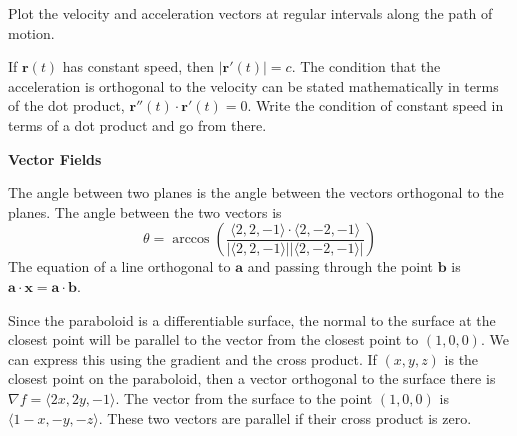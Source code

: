 \begin{Hint}
  \label{hint parametric cos t/2 + sin t/2}
  Plot the velocity and acceleration vectors at regular intervals 
  along the path of motion.
\end{Hint}



\begin{Hint}
  \label{hint constant speed acceleration orthogonal}
  If $\mathbf{r}(t)$ has constant speed, then $| \mathbf{r}'(t) | = c$.
  The condition that the acceleration is orthogonal to the
  velocity can be stated mathematically in terms of the dot product,
  $\mathbf{r}''(t) \cdot \mathbf{r}'(t) = 0$.  Write the condition
  of constant speed in terms of a dot product and go from there.
\end{Hint}



\begin{large}
  \noindent
  \textbf{Vector Fields}
\end{large}



\begin{Hint}
  \label{hint paraboloid x2 + y2 - z}
  The angle between two planes is the angle between the vectors orthogonal to 
  the planes.  The angle between the two vectors is
  \[
  \theta = \arccos \left( \frac{ \langle 2,2,-1 \rangle \cdot \langle 2,-2,-1 \rangle }
    { | \langle 2,2,-1 \rangle | | \langle 2,-2,-1 \rangle | } \right)
  \]
  The equation of a line orthogonal to $\mathbf{a}$ and passing 
  through the point $\mathbf{b}$ is $\mathbf{a} \cdot \mathbf{x} = \mathbf{a} \cdot \mathbf{b}$.
\end{Hint}



\begin{Hint}
  \label{hint paraboloid closest point}
  Since the paraboloid is a differentiable surface, the normal to the surface
  at the closest point will be parallel to the vector from the closest
  point to $(1,0,0)$.  We can express this using the gradient and the 
  cross product.  If $(x,y,z)$ is the closest point on the paraboloid, then
  a vector orthogonal to the surface there is $\nabla f = \langle 2x,2y,-1 \rangle$.
  The vector from the surface to the point $(1,0,0)$ is $\langle 1-x,-y,-z \rangle$.
  These two vectors are parallel if their cross product is zero.
\end{Hint}



